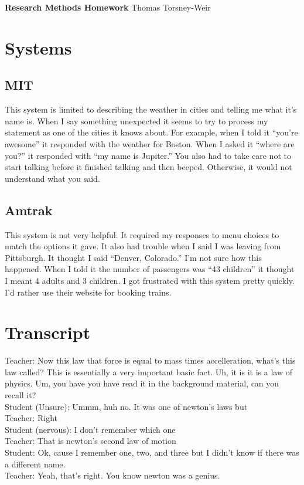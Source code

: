 \documentclass[10pt]{article}
\begin{document}
{\bf Research Methods Homework} \hfill {\raggedleft Thomas Torsney-Weir}

\section{Systems}
\subsection{MIT}
This system is limited to describing the weather in cities and telling me what 
it's name is.  When I say something unexpected it seems to try to process my
statement as one of the cities it knows about.  For example, when I told it
``you're awesome'' it responded with the weather for Boston.  When I asked it
``where are you?'' it responded with ``my name is Jupiter.''  You also had
to take care not to start talking before it finished talking and then beeped.
Otherwise, it would not understand what you said.

\subsection{Amtrak}
This system is not very helpful.  It required my responses to menu choices to
match the options it gave.  It also had trouble when I said I was leaving from
Pittsburgh.  It thought I said ``Denver, Colorado.''  I'm not sure how this
happened.  When I told it the number of passengers was ``43 children'' it
thought I meant 4 adults and 3 children.  I got frustrated with this system
pretty quickly.  I'd rather use their website for booking trains.

\section{Transcript}
Teacher: Now this law that force is equal to mass times accelleration, what's 
this law called? This is essentially a very important basic fact.  Uh, it is 
it is a law of physics.  Um, you have you have read it in the background 
material, can you recall it? \\
Student (Unsure): Ummm, huh no.  It was one of newton's laws but \\
Teacher: Right \\
Student (nervous): I don't remember which one \\
Teacher: That is newton's second law of motion \\
Student: Ok, cause I remember one, two, and three but I didn't know if there 
was a different name. \\
Teacher: Yeah, that's right.  You know newton was a genius.
\end{document}
